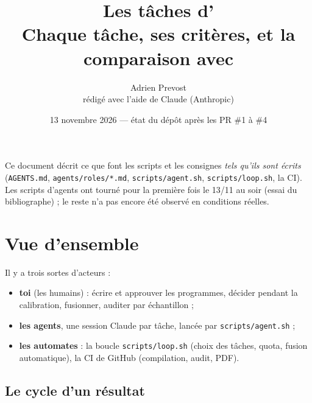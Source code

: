 \documentclass[11pt,a4paper]{article}
\title{Les tâches d'\proj{}\\[0.3em]
  \large Chaque tâche, ses critères, et la comparaison avec \lmlx{}}
\author{Adrien Prevost\\ \small rédigé avec l'aide de Claude (Anthropic)}
\date{13 novembre 2026 --- état du dépôt après les PR \#1 à \#4}
\newcommand{\cmd}[1]{\texttt{#1}}
\begin{document}
\maketitle

\begin{note}
Ce document décrit ce que font les scripts et les consignes \emph{tels qu'ils sont écrits}
(\cmd{AGENTS.md}, \cmd{agents/roles/*.md}, \cmd{scripts/agent.sh}, \cmd{scripts/loop.sh}, la CI).
Les scripts d'agents ont tourné pour la première fois le 13/11 au soir (essai du bibliographe) ;
le reste n'a pas encore été observé en conditions réelles.
\end{note}

\tableofcontents

\section{Vue d'ensemble}

Il y a trois sortes d'acteurs :
\begin{itemize}
\item \textbf{toi} (les humains) : écrire et approuver les programmes, décider pendant la calibration,
  fusionner, auditer par échantillon ;
\item \textbf{les agents}, une session Claude par tâche, lancée par \cmd{scripts/agent.sh} ;
\item \textbf{les automates} : la boucle \cmd{scripts/loop.sh} (choix des tâches, quota, fusion
  automatique), la CI de GitHub (compilation, audit, PDF).
\end{itemize}

\subsection*{Le cycle d'un résultat}
\end{document}
